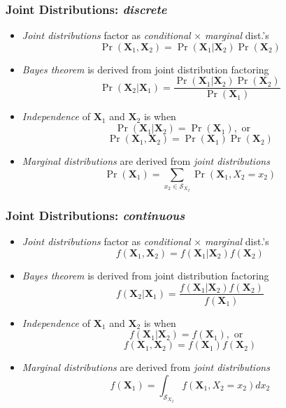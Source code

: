 \documentclass[xcolor={dvipsnames}]{beamer}
\begin{document}
\frame
{
 \frametitle{Joint Distributions: \emph{discrete}}%

\begin{itemize}
\item \emph{Joint distributions} factor as \emph{conditional} $\times$ \emph{marginal} dist.'s
$$\Pr(\textbf{X}_1,\textbf{X}_2) =  \Pr(\textbf{X}_1|\textbf{X}_2) \Pr(\textbf{X}_2)$$
\item<2->  \emph{Bayes theorem} is derived from joint distribution factoring
$$\Pr(\textbf{X}_2|\textbf{X}_1) = \frac{\Pr(\textbf{X}_1|\textbf{X}_2)\Pr(\textbf{X}_2)}{\Pr(\textbf{X}_1)}$$
\item<3-> \emph{Independence} of $\textbf{X}_1$ and $\textbf{X}_2$ is when
$$\Pr(\textbf{X}_1|\textbf{X}_2) =  \Pr(\textbf{X}_1), \text{ or}\quad\;\;$$ 
$$\Pr(\textbf{X}_1,\textbf{X}_2) = \Pr(\textbf{X}_1)\Pr(\textbf{X}_2)$$

\item<4->  \emph{Marginal distributions} are derived from \emph{joint distributions}
$$\Pr(\textbf{X}_1) = \sum_{x_2 \in \mathcal{S}_{X_2}} \Pr(\textbf{X}_1,X_2=x_2) $$ 

\end{itemize}
}


\frame
{
 \frametitle{Joint Distributions: \emph{continuous}}%

\begin{itemize}
\item \emph{Joint distributions} factor as \emph{conditional} $\times$ \emph{marginal} dist.'s
$$f(\textbf{X}_1,\textbf{X}_2) =  f(\textbf{X}_1|\textbf{X}_2) f(\textbf{X}_2)$$
\item  \emph{Bayes theorem} is derived from joint distribution factoring
$$f(\textbf{X}_2|\textbf{X}_1) = \frac{f(\textbf{X}_1|\textbf{X}_2)f(\textbf{X}_2)}{f(\textbf{X}_1)}$$
\item \emph{Independence} of $\textbf{X}_1$ and $\textbf{X}_2$ is when
$$f(\textbf{X}_1|\textbf{X}_2) =  f(\textbf{X}_1), \text{ or}\;\;\;$$ 
$$f(\textbf{X}_1,\textbf{X}_2) = f(\textbf{X}_1)f(\textbf{X}_2)$$

\item  \emph{Marginal distributions} are derived from \emph{joint distributions}
$$f(\textbf{X}_1) = \int_{ \mathcal{S}_{X_2}} f(\textbf{X}_1,X_2=x_2) dx_2 $$ 

\end{itemize}
}
\end{document}
